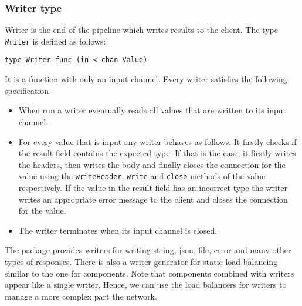 \subsubsection{Writer type}
Writer is the end of the pipeline which writes results to the client.
The type \texttt{Writer} is defined as follows:
\begin{lstlisting}
type Writer func (in <-chan Value)
\end{lstlisting}
It is a function with only an input channel.
Every writer satisfies the following specification.
\begin{itemize}
    \item When run a writer eventually reads all values that are written 
          to its input channel.

	\item For every value that is input any writer behaves as follows. 
          It firstly checks if the result field contains the expected type. 
          If that is the case, it firstly writes the headers, then
          writes the body and finally closes the connection for the value
          using the \texttt{writeHeader}, \texttt{write} and \texttt{close}
          methods of the value respectively. If the value in the result 
          field has an incorrect type the writer writes an appropriate 
          error message to the client and closes the connection for the value. 

	\item The writer terminates when its input channel is closed.
\end{itemize}
The package provides writers for writing string, json, file, error and many
other types of responses. There is also a writer generator for static
load balancing similar to the one for components. Note that components
combined with writers appear like a single writer. Hence, we can use the
load balancers for writers to manage a more complex part the network.

